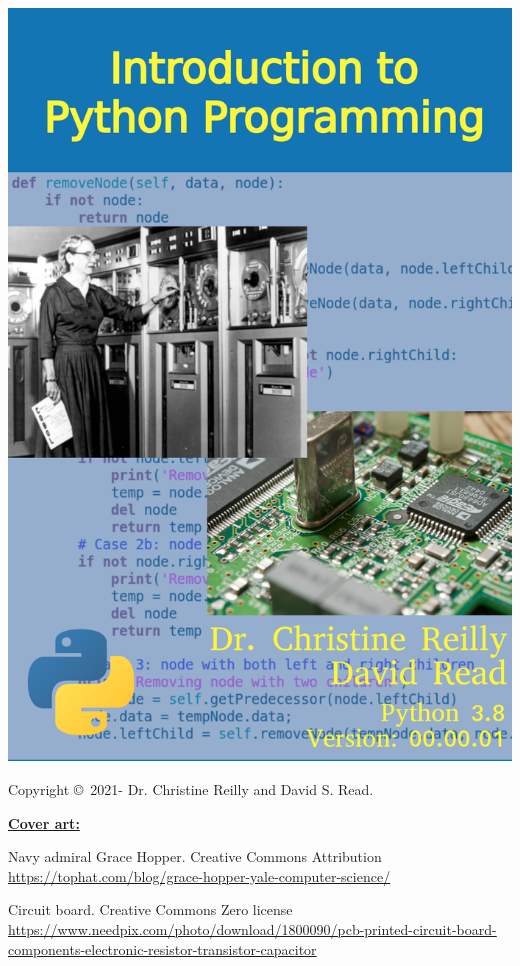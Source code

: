 \begin{latexonly}
\begin{titlepage}
	\includegraphics[width=5.25in]{python-cover/CoverBackground.png}
\end{titlepage}

\pagebreak
\thispagestyle{empty}

{\small
Copyright \copyright ~2021- Dr. Christine Reilly and David S. Read.

\underline{\textbf{Cover art:}}

Navy admiral Grace Hopper. Creative Commons Attribution
\newline
\url{https://tophat.com/blog/grace-hopper-yale-computer-science/}

Circuit board. Creative Commons Zero license
\newline \url{https://www.needpix.com/photo/download/1800090/pcb-printed-circuit-board-components-electronic-resistor-transistor-capacitor}

}
\end{latexonly}
